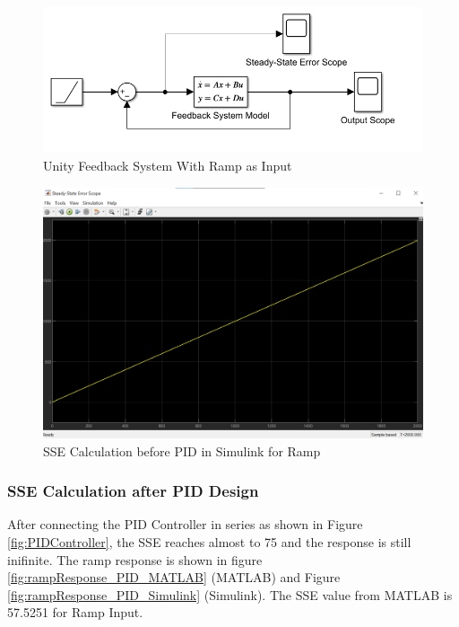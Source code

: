 \documentclass{article}
\begin{document}
\begin{figure}[h!]
	\centering
	\includegraphics[scale=0.75]{images/SSE_Sketch_Ramp.png}
	\caption{Unity Feedback System With Ramp as Input}
	\label{fig:SSE_Sketch_Ramp}
\end{figure}

\begin{figure}[h!]
	\centering
	\includegraphics[scale=0.5]{images/SSE_BeforePID_Simulink_Ramp.png}
	\caption{SSE Calculation before PID in Simulink for Ramp}
	\label{fig:SSE_BeforePID_SimulinkRamp}
\end{figure}


\subsubsection{SSE Calculation after PID Design}
After connecting the PID Controller in series as shown in Figure \ref{fig:PIDController}, the SSE reaches almost to 75 and the response is still inifinite. The ramp response is shown in figure \ref{fig:rampResponse_PID_MATLAB} (MATLAB) and Figure \ref{fig:rampResponse_PID_Simulink} (Simulink). The SSE value from MATLAB is 57.5251 for Ramp Input. 
\end{document}
